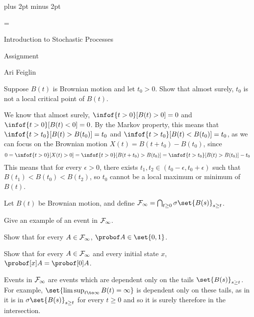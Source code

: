 

\parindent=0cm
\parskip=3pt plus 2pt minus 2pt





\footline={}

\def\printmcount{\the\counter{section}.\the\counter{math counter}}
\setcounter{section}{9}


{

    \centerline{Introduction to Stochastic Processes}
    \smallskip
    \centerline{Assignment \the{}}
    \centerline{Ari Feiglin}

\eppbox}

\bigskip

\bexerc

    Suppose $B(t)$ is Brownian motion and let $t_0>0$.
    Show that almost surely, $t_0$ is not a local critical point of $B(t)$.

\eexerc

We know that almost surely, $\infof{t>0}[B(t)>0]=0$ and $\infof{t>0}[B(t)<0]=0$.
By the Markov property, this means that $\infof{t>t_0}[B(t)>B(t_0)]=t_0$ and $\infof{t>t_0}[B(t)<B(t_0)]=t_0$, as we can focus on the Brownian motion $X(t)=B(t+t_0)-B(t_0)$, since
$$ 0=\infof{t>0}[X(t)>0]=\infof{t>0}[B(t+t_0)>B(t_0)]=\infof{t>t_0}[B(t)>B(t_0)]-t_0 $$
This means that for every $\epsilon>0$, there exists $t_1,t_2\in(t_0-\epsilon,t_0+\epsilon)$ such that $B(t_1)<B(t_0)<B(t_2)$, so $t_0$ cannot be a local maximum or minimum of $B(t)$.

\bexerc

    Let $B(t)$ be Brownian motion, and define ${\cal F}_\infty=\bigcap_{t\geq0}\sigma\set{B(s)}_{s\geq t}$.
    \benum
        \item Give an example of an event in ${\cal F}_\infty$.
        \item Show that for every $A\in{\cal F}_\infty$, $\probof A\in\set{0,1}$.
        \item Show that for every $A\in{\cal F}_\infty$ and every initial state $x$, $\probof[x]A=\probof[0]A$.
    \eenum

\eexerc

\benum
    \item Events in ${\cal F}_\infty$ are events which are dependent only on the tails $\set{B(s)}_{s\geq t}$.
    For example, $\set{\limsup_{t\to\infty}B(t)=\infty}$ is dependent only on these tails, as in it is in $\sigma\set{B(s)}_{s\geq t}$ for every $t\geq0$ and so it is surely therefore in the intersection.

